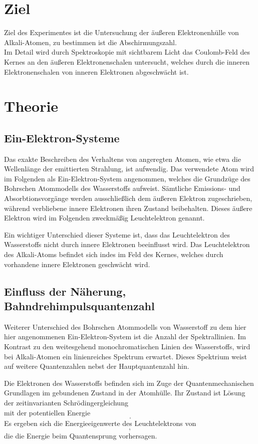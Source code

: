 \section*{Ziel}
Ziel des Experimentes ist die Untersuchung der äußeren Elektronenhülle von Alkali-Atomen, zu bestimmen ist die Abschirmungszahl.\\
Im Detail wird durch Spektroskopie mit sichtbarem Licht das Coulomb-Feld des Kernes an den äußeren Elektronenschalen untersucht,
welches durch die inneren Elektronenschalen von inneren Elektronen abgeschwächt ist.

\section{Theorie}
\label{sec:Theorie}
\subsection{Ein-Elektron-Systeme} %
\label{sub:1e}
Das exakte Beschreiben des Verhaltens von angeregten Atomen, wie etwa die Wellenlänge der emittierten Strahlung, ist aufwendig.
Das verwendete Atom wird im Folgenden als Ein-Elektron-System angenommen, welches die Grundzüge des Bohrschen Atommodells des Wasserstoffs aufweist.
Sämtliche Emissions- und Absorbtionsvorgänge werden ausschließlich dem äußeren Elektron zugeschrieben, während verbliebene innere Elektronen ihren Zustand beibehalten.
Dieses äußere Elektron wird im Folgenden zweckmäßig Leuchtelektron genannt.

Ein wichtiger Unterschied dieser Systeme ist, dass das Leuchtelektron des Wasserstoffs nicht durch innere Elektronen beeinflusst wird.
Das Leuchtelektron des Alkali-Atoms befindet sich indes im Feld des Kernes, welches durch vorhandene innere Elektronen geschwächt wird.

\subsection{Einfluss der Näherung, Bahndrehimpulsquantenzahl} %
\label{sub:L_quantenzahl}
Weiterer Unterschied des Bohrschen Atommodells von Wasserstoff zu dem hier hier angenommenen Ein-Elektron-System ist die Anzahl der Spektrallinien. 
Im Kontrast zu den weitesgehend monochromatischen Linien des Wasserstoffs, wird bei Alkali-Atomen ein linienreiches Spektrum erwartet.
Dieses Spektrium weist auf weitere Quantenzahlen nebst der Hauptquantenzahl hin.

Die Elektronen des Wasserstoffs befinden sich im Zuge der Quantenmechanischen Grundlagen im gebundenen Zustand in der Atomhülle.
Ihr Zustand ist Lösung der zeitinvarianten Schrödingergleichung
\begin{equation}
	\label{eq:schroedinger}
\end{equation}
mit der potentiellen Energie 
\begin{equation}
	.
	\label{eq:Epot}
\end{equation}
Es ergeben sich die Energieeigenwerte des Leuchtelektrons von
\begin{equation}
	\label{eq:EEW},
\end{equation}
die die Energie beim Quantensprung vorhersagen.

